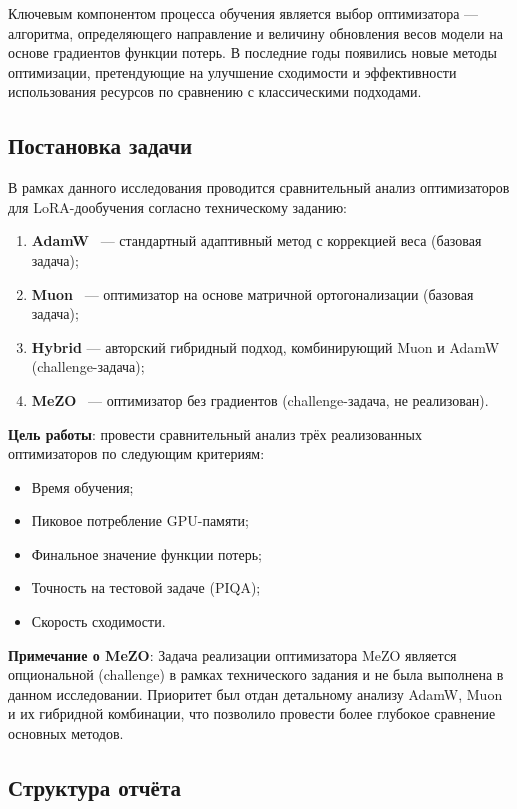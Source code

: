 \documentclass[a4paper,12pt]{article}
\begin{document}
Ключевым компонентом процесса обучения является выбор оптимизатора --- алгоритма, определяющего направление и величину обновления весов модели на основе градиентов функции потерь. В последние годы появились новые методы оптимизации, претендующие на улучшение сходимости и эффективности использования ресурсов по сравнению с классическими подходами.

\subsection{Постановка задачи}

В рамках данного исследования проводится сравнительный анализ оптимизаторов для LoRA-дообучения согласно техническому заданию:

\begin{enumerate}
    \item \textbf{AdamW}~\cite{loshchilov2019adamw} --- стандартный адаптивный метод с коррекцией веса (базовая задача);
    \item \textbf{Muon}~\cite{moonshot2024muon} --- оптимизатор на основе матричной ортогонализации (базовая задача);
    \item \textbf{Hybrid} --- авторский гибридный подход, комбинирующий Muon и AdamW (challenge-задача);
    \item \textbf{MeZO}~\cite{mezo2023} --- оптимизатор без градиентов (challenge-задача, не реализован).
\end{enumerate}

\textbf{Цель работы}: провести сравнительный анализ трёх реализованных оптимизаторов по следующим критериям:
\begin{itemize}
    \item Время обучения;
    \item Пиковое потребление GPU-памяти;
    \item Финальное значение функции потерь;
    \item Точность на тестовой задаче (PIQA);
    \item Скорость сходимости.
\end{itemize}

\textbf{Примечание о MeZO}: Задача реализации оптимизатора MeZO является опциональной (challenge) в рамках технического задания и не была выполнена в данном исследовании. Приоритет был отдан детальному анализу AdamW, Muon и их гибридной комбинации, что позволило провести более глубокое сравнение основных методов.

\subsection{Структура отчёта}
\end{document}
